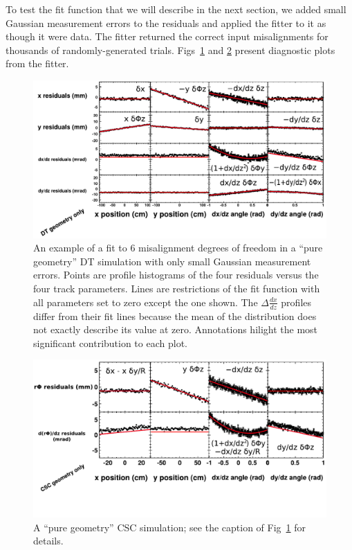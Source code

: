 \documentclass[12pt]{article}
\begin{document}
To test the fit function that we will describe in the next section, we
added small Gaussian measurement errors to the residuals and applied
the fitter to it as though it were data.  The fitter returned the
correct input misalignments for thousands of randomly-generated trials.
Figs~\ref{fig:geometryonly_dt} and \ref{fig:geometryonly_csc} present
diagnostic plots from the fitter.

\begin{figure}
\includegraphics[width=\linewidth]{geometryonly_dt.pdf}
\caption{An example of a fit to 6 misalignment degrees of freedom in a
  ``pure geometry'' DT simulation with only small Gaussian measurement
  errors.  Points are profile histograms of the four residuals versus
  the four track parameters.  Lines are restrictions of the fit
  function with all parameters set to zero except the one shown.  The
  $\Delta \frac{dx}{dz}$ profiles differ from their fit lines because
  the mean of the distribution does not exactly describe its value at
  zero.  Annotations hilight the most significant contribution to each
  plot. \label{fig:geometryonly_dt}}
\end{figure}

\begin{figure}
\includegraphics[width=\linewidth]{geometryonly_csc.pdf}

\vspace{-1.5 cm}
\caption{A ``pure geometry'' CSC simulation; see the caption of
  Fig~\ref{fig:geometryonly_dt} for details. \label{fig:geometryonly_csc}}
\end{figure}
\end{document}
